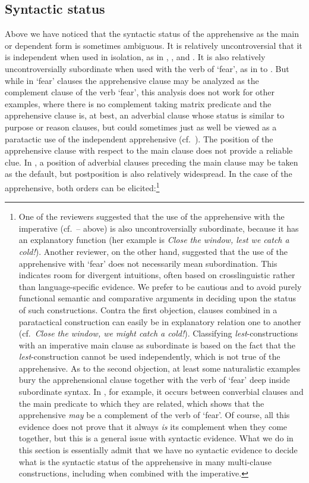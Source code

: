 \documentclass[output=paper,colorlinks,citecolor=brown]{langscibook}
\begin{document}
\subsection{Syntactic status}
\label{subsec:Asyntactic}
\largerpage

Above we have noticed that the syntactic status of the apprehensive as the main or dependent form is sometimes ambiguous. It is relatively uncontroversial that it is independent when used in isolation, as in , ,  and . It is also relatively uncontroversially subordinate when used with the verb of `fear', as in  to . But while in `fear' clauses the apprehensive clause may be analyzed as the complement clause of the verb `fear', this analysis does not work for other examples, where there is no complement taking matrix predicate and the apprehensive clause is, at best, an adverbial clause whose status is similar to purpose or reason clauses, but could sometimes just as well be viewed as a paratactic use of the independent apprehensive (cf.\ ). The position of the apprehensive clause with respect to the main clause does not provide a reliable clue. In , a position of adverbial clauses preceding the main clause may be taken as the default, but postposition is also relatively widespread. In the case of the apprehensive, both orders can be elicited:\footnote{One of the reviewers suggested that the use of the apprehensive with the imperative (cf.\ -- above) is also uncontroversially subordinate, because it has an explanatory function (her example is  \textit{Close the window, lest we catch a cold!}). Another reviewer, on the other hand, suggested that the use of the apprehensive with `fear' does not necessarily mean subordination. This indicates room for divergent intuitions, often based on crosslinguistic rather than language-specific evidence. We prefer to be cautious and to avoid purely functional semantic and comparative arguments in deciding upon the status of such constructions. Contra the first objection, clauses combined in a paratactical construction can easily be in explanatory relation one to another (cf.\ \textit{Close the window, we might catch a cold!}). Classifying  \textit{lest}-constructions with an imperative main clause as subordinate is based on the fact that the \textit{lest}-construction cannot be used independently, which is not true of the  apprehensive. As to the second objection, at least some naturalistic examples bury the apprehensional clause together with the verb of `fear' deep inside subordinate syntax. In , for example, it occurs between converbial clauses and the main predicate to which they are related, which shows that the apprehensive \textit{may} be a complement of the verb of `fear'. Of course, all this evidence does not prove that it always \textit{is} its complement when they come together, but this is a general issue with syntactic evidence. What we do in this section is essentially admit that we have no syntactic evidence to decide what is the syntactic status of the apprehensive in many multi-clause constructions, including when combined with the imperative.}
\end{document}
